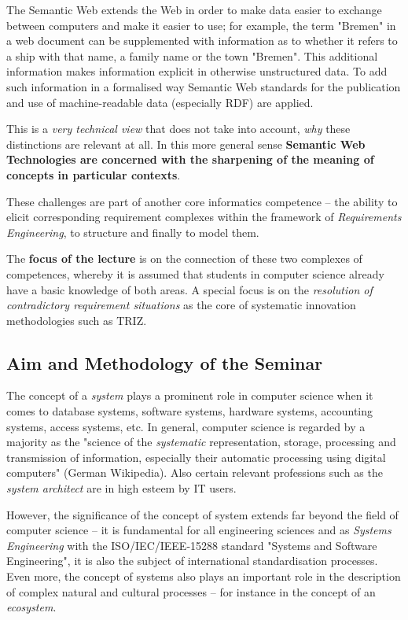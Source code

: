\documentclass[11pt,a4paper]{article}
\begin{document}
The Semantic Web extends the Web in order to make data easier to exchange
between computers and make it easier to use; for example, the term "Bremen" in
a web document can be supplemented with information as to whether it refers to
a ship with that name, a family name or the town "Bremen". This additional
information makes information explicit in otherwise unstructured data. To add
such information in a formalised way Semantic Web standards for the
publication and use of machine-readable data (especially RDF) are applied.

This is a \emph{very technical view} that does not take into account,
\emph{why} these distinctions are relevant at all. In this more general sense
\textbf{Semantic Web Technologies are concerned with the sharpening of the
  meaning of concepts in particular contexts}.

These challenges are part of another core informatics competence – the ability
to elicit corresponding requirement complexes within the framework of
\emph{Requirements Engineering}, to structure and finally to model them.

The \textbf{focus of the lecture} is on the connection of these two complexes
of competences, whereby it is assumed that students in computer science
already have a basic knowledge of both areas. A special focus is on the
\emph{resolution of contradictory requirement situations} as the core of
systematic innovation methodologies such as TRIZ.

\subsection{Aim and Methodology of the Seminar}

The concept of a \emph{system} plays a prominent role in computer science when
it comes to database systems, software systems, hardware systems, accounting
systems, access systems, etc.  In general, computer science is regarded by a
majority as the "science of the \emph{systematic} representation, storage,
processing and transmission of information, especially their automatic
processing using digital computers" (German Wikipedia).  Also certain relevant
professions such as the \emph{system architect} are in high esteem by IT
users.

However, the significance of the concept of system extends far beyond the
field of computer science -- it is fundamental for all engineering sciences
and as \emph{Systems Engineering} with the ISO/IEC/IEEE-15288 standard
"Systems and Software Engineering", it is also the subject of international
standardisation processes.  Even more, the concept of systems also plays an
important role in the description of complex natural and cultural processes --
for instance in the concept of an \emph{ecosystem}.
\end{document}
